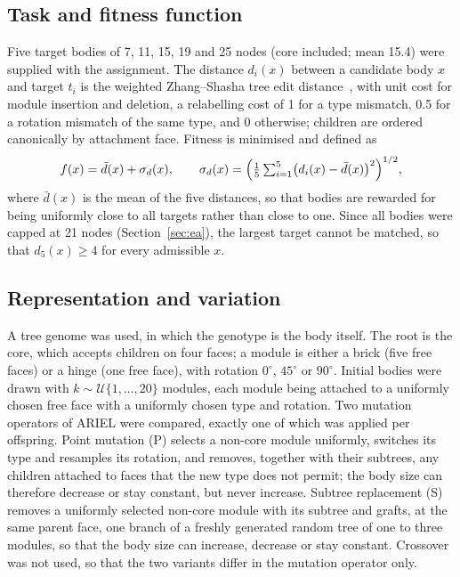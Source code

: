 \documentclass[sigconf]{acmart}
\begin{document}
\subsection{Task and fitness function}
Five target bodies of 7, 11, 15, 19 and 25 nodes (core included; mean 15.4) were supplied with the assignment.
The distance $d_i(x)$ between a candidate body $x$ and target $t_i$ is the weighted Zhang--Shasha tree edit distance~\cite{zhang1989}, with unit cost for module insertion and deletion, a relabelling cost of 1 for a type mismatch, 0.5 for a rotation mismatch of the same type, and 0 otherwise; children are ordered canonically by attachment face.
Fitness is minimised and defined as
\[
  f(x) = \bar{d}(x) + \sigma_d(x), \qquad
  \sigma_d(x) = \Bigl(\tfrac{1}{5}\textstyle\sum_{i=1}^{5}\bigl(d_i(x) - \bar{d}(x)\bigr)^2\Bigr)^{1/2},
\]
where $\bar{d}(x)$ is the mean of the five distances, so that bodies are rewarded for being uniformly close to all targets rather than close to one.
Since all bodies were capped at 21 nodes (Section~\ref{sec:ea}), the largest target cannot be matched, so that $d_5(x) \geq 4$ for every admissible $x$.

\subsection{Representation and variation}
A tree genome was used, in which the genotype is the body itself.
The root is the core, which accepts children on four faces; a module is either a brick (five free faces) or a hinge (one free face), with rotation $0^\circ$, $45^\circ$ or $90^\circ$.
Initial bodies were drawn with $k \sim \mathcal{U}\{1,\dots,20\}$ modules, each module being attached to a uniformly chosen free face with a uniformly chosen type and rotation.
Two mutation operators of ARIEL were compared, exactly one of which was applied per offspring.
Point mutation (P) selects a non-core module uniformly, switches its type and resamples its rotation, and removes, together with their subtrees, any children attached to faces that the new type does not permit; the body size can therefore decrease or stay constant, but never increase.
Subtree replacement (S) removes a uniformly selected non-core module with its subtree and grafts, at the same parent face, one branch of a freshly generated random tree of one to three modules, so that the body size can increase, decrease or stay constant.
Crossover was not used, so that the two variants differ in the mutation operator only.
\end{document}
